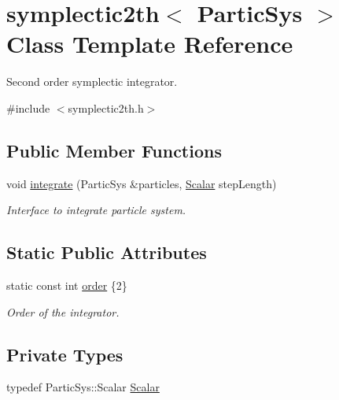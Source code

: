 \hypertarget{classsymplectic2th}{}\section{symplectic2th$<$ Partic\+Sys $>$ Class Template Reference}
\label{classsymplectic2th}


Second order symplectic integrator.  




{\ttfamily \#include $<$symplectic2th.\+h$>$}

\subsection*{Public Member Functions}
\begin{DoxyCompactItemize}
\item 
void \mbox{\hyperlink{classsymplectic2th_ade78f67685ed50280a210e67397af092}{integrate}} (Partic\+Sys \&particles, \mbox{\hyperlink{classsymplectic2th_a08d72f435fb4c69320ead95ba05625a1}{Scalar}} step\+Length)
\begin{DoxyCompactList}\small\item\em Interface to integrate particle system. \end{DoxyCompactList}\end{DoxyCompactItemize}
\subsection*{Static Public Attributes}
\begin{DoxyCompactItemize}
\item 
static const int \mbox{\hyperlink{classsymplectic2th_a1082d668c1081ff0116e8816f1240fcd}{order}} \{2\}
\begin{DoxyCompactList}\small\item\em Order of the integrator. \end{DoxyCompactList}\end{DoxyCompactItemize}
\subsection*{Private Types}
\begin{DoxyCompactItemize}
\item 
typedef Partic\+Sys\+::\+Scalar \mbox{\hyperlink{classsymplectic2th_a08d72f435fb4c69320ead95ba05625a1}{Scalar}}
\end{DoxyCompactItemize}


